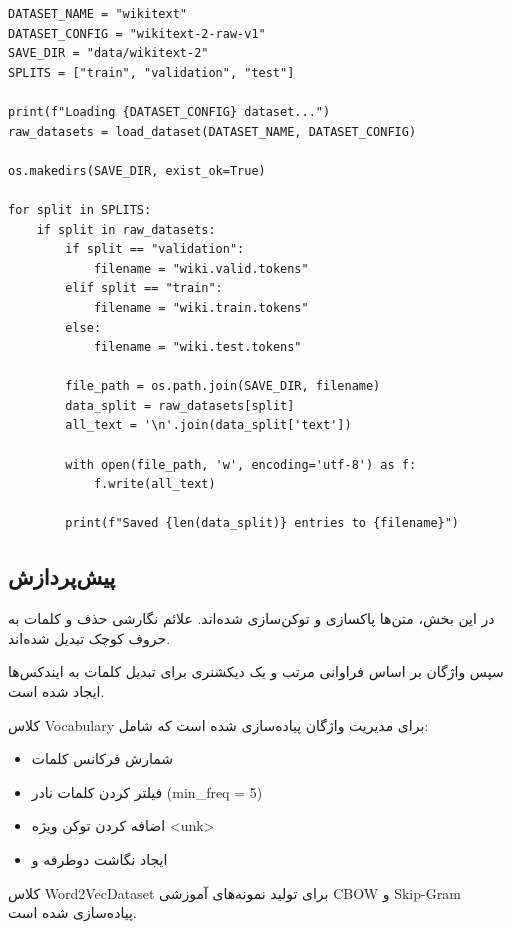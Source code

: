 \documentclass[12pt,a4paper]{article}
\begin{document}
\begin{lstlisting}[caption=کد بارگذاری داده]
DATASET_NAME = "wikitext"
DATASET_CONFIG = "wikitext-2-raw-v1"
SAVE_DIR = "data/wikitext-2"
SPLITS = ["train", "validation", "test"]

print(f"Loading {DATASET_CONFIG} dataset...")
raw_datasets = load_dataset(DATASET_NAME, DATASET_CONFIG)

os.makedirs(SAVE_DIR, exist_ok=True)

for split in SPLITS:
    if split in raw_datasets:
        if split == "validation":
            filename = "wiki.valid.tokens"
        elif split == "train":
            filename = "wiki.train.tokens"
        else:
            filename = "wiki.test.tokens"

        file_path = os.path.join(SAVE_DIR, filename)
        data_split = raw_datasets[split]
        all_text = '\n'.join(data_split['text'])

        with open(file_path, 'w', encoding='utf-8') as f:
            f.write(all_text)

        print(f"Saved {len(data_split)} entries to {filename}")
\end{lstlisting}

\subsection{پیش‌پردازش}
در این بخش، متن‌ها پاکسازی و توکن‌سازی شده‌اند. علائم نگارشی حذف و کلمات به حروف کوچک تبدیل شده‌اند.

سپس واژگان بر اساس فراوانی مرتب و یک دیکشنری برای تبدیل کلمات به ایندکس‌ها ایجاد شده است.

کلاس Vocabulary برای مدیریت واژگان پیاده‌سازی شده است که شامل:
\begin{itemize}
\item شمارش فرکانس کلمات
\item فیلتر کردن کلمات نادر (min\_freq = 5)
\item اضافه کردن توکن ویژه <unk>
\item ایجاد نگاشت دوطرفه  و 
\end{itemize}

کلاس Word2VecDataset برای تولید نمونه‌های آموزشی CBOW و Skip-Gram پیاده‌سازی شده است.
\end{document}
